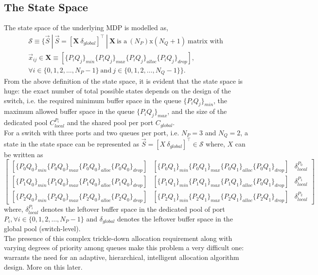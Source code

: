 \documentclass{article}
\begin{document}
\subsection{The State Space}
The state space of the underlying MDP is modelled as,
\begin{equation}
    \begin{aligned}
        \mathcal{S} \equiv \{\vec{S}\ |\ \vec{S} = [\textbf{X}\ \delta_{global}]^\intercal\ |\ \textbf{X}\ \text{is a}\ (N_P) \text{x} (N_Q+1)\ \text{matrix with}\ \\\vec{x}_{ij} \in \textbf{X} \equiv [\{P_i Q_j\}_{min} \{P_i Q_j\}_{max} \{P_i Q_j\}_{alloc} \{P_i Q_j\}_{drop}],\ \\
        \forall i \in \{0, 1, 2, \dots, N_P-1\}\ \text{and}\ j \in \{0, 1, 2, \dots, N_Q-1\}\}.
    \end{aligned}
\end{equation}
From the above definition of the state space, it is evident that the state space is huge: the exact number of total possible states depends on the design of the switch, i.e. the required minimum buffer space in the queue $\{P_i Q_j\}_{min}$, the maximum allowed buffer space in the queue $\{P_i Q_j\}_{max}$, and the size of the dedicated pool $C_{local}^{P_i}$ and the shared pool per port $C_{global}$.
\\For a switch with three ports and two queues per port, i.e. $N_P = 3$ and $N_Q = 2$, a state in the state space can be represented as $\vec{S} = [X\ \delta_{global}]^\intercal \in \mathcal{S}$ where, $X$ can be written as
$$
\begin{bmatrix} 
[\{P_0 Q_0\}_{min} \{P_0 Q_0\}_{max} \{P_0 Q_0\}_{alloc} \{P_0 Q_0\}_{drop}] & [\{P_0 Q_1\}_{min} \{P_0 Q_1\}_{max} \{P_0 Q_1\}_{alloc} \{P_0 Q_1\}_{drop}] & \delta_{local}^{P_0}\\
[\{P_1 Q_0\}_{min} \{P_1 Q_0\}_{max} \{P_1 Q_0\}_{alloc} \{P_1 Q_0\}_{drop}] & [\{P_1 Q_1\}_{min} \{P_1 Q_1\}_{max} \{P_1 Q_1\}_{alloc} \{P_0 Q_1\}_{drop}] & \delta_{local}^{P_1}\\
[\{P_2 Q_0\}_{min} \{P_2 Q_0\}_{max} \{P_2 Q_0\}_{alloc} \{P_2 Q_0\}_{drop}] & [\{P_2 Q_1\}_{min} \{P_2 Q_1\}_{max} \{P_2 Q_1\}_{alloc} \{P_2 Q_1\}_{drop}] & \delta_{local}^{P_2}
\end{bmatrix}
$$
where, $\delta_{local}^{P_i}$ denotes the leftover buffer space in the dedicated pool of port $P_i, \forall i \in \{0, 1, 2, \dots, N_P-1\}$ and $\delta_{global}$ denotes the leftover buffer space in the global pool (switch-level). 
\\The presence of this complex trickle-down allocation requirement along with varying degrees of priority among queues make this problem a very difficult one: warrants the need for an adaptive, hierarchical, intelligent allocation algorithm design. More on this later.
\end{document}
